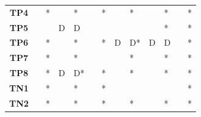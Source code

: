 \begin{table}
\begin{tabularx}{\textwidth}{ c YYYYYYYYYYYY}
        \textbf{TP4}  &                                  & *                                    &                                        & *                                        &                                       & *                                      &             & *          &             & *          &             & *          \\
        \textbf{TP5}  &                                  &                                      & D                                      & D                                        &                                       &                                        &             &            &             & *          &             & *          \\
        \textbf{TP6}  &                                  & *                                    &                                        & *                                        &                                       & *                                      & D           & D*         & D           & D          &             & *          \\
        \textbf{TP7}  &                                  & *                                    &                                        & *                                        &                                       &                                        &             & *          &             & *          &             & *          \\
        \textbf{TP8}  &                                  & *                                    & D                                      & D*                                       &                                       & *                                      &             & *          &             & *          &             & *          \\
        \midrule
        \textbf{TN1}  &                                  & *                                    &                                        & *                                        &                                       & *                                      &             &            &             &            &             & *          \\
        \textbf{TN2}  &                                  & *                                    &                                        & *                                        &                                       & *                                      &             & *          &             & *          &             & *          \\

\end{tabularx}
\end{table}
